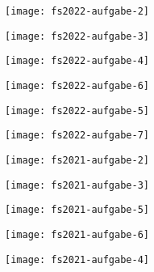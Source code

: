 

\texttt{[image: fs2022-aufgabe-2]}

\texttt{[image: fs2022-aufgabe-3]}

\texttt{[image: fs2022-aufgabe-4]}

\texttt{[image: fs2022-aufgabe-6]}

\texttt{[image: fs2022-aufgabe-5]}

\texttt{[image: fs2022-aufgabe-7]}


\texttt{[image: fs2021-aufgabe-2]}

\texttt{[image: fs2021-aufgabe-3]}

\texttt{[image: fs2021-aufgabe-5]}

\texttt{[image: fs2021-aufgabe-6]}

\texttt{[image: fs2021-aufgabe-4]}